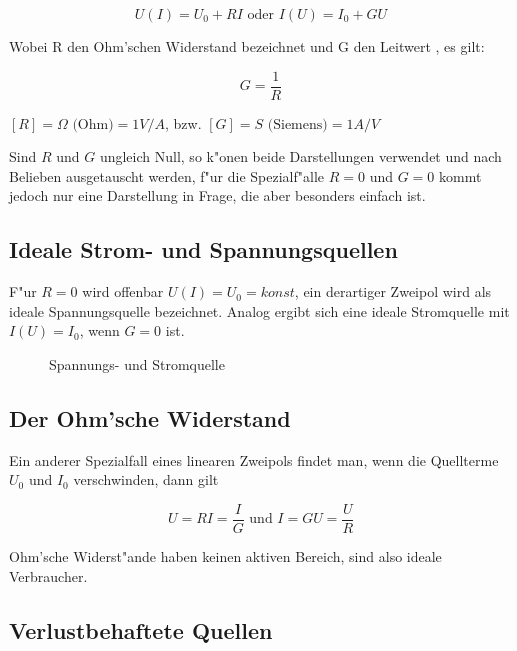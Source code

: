 \documentclass[german, 10pt, a4paper, headsepline]{scrreprt}
\theoremstyle{remark}
\begin{document}
\begin{displaymath}
	U(I)=U_0+RI \mbox{ oder } I(U)=I_0+GU
\end{displaymath}

Wobei R den Ohm'schen Widerstand  bezeichnet und G den Leitwert , es gilt:

\begin{displaymath}
	G=\frac{1}{R}
\end{displaymath}

$[R]=\Omega\mbox{ (Ohm)}=1V/A$, bzw. $[G]=S \mbox{ (Siemens)}=1A/V$

Sind $R$ und $G$ ungleich Null, so k"onen beide Darstellungen verwendet und nach Belieben ausgetauscht werden, f"ur die Spezialf"alle $R=0$ und $G=0$ kommt jedoch nur eine Darstellung in Frage, die aber besonders einfach ist.

\subsection{Ideale Strom- und Spannungsquellen}


F"ur $R=0$ wird offenbar $U(I)=U_0=konst$, ein derartiger Zweipol wird als ideale Spannungsquelle bezeichnet. Analog ergibt sich eine ideale Stromquelle mit $I(U)=I_0$, wenn $G=0$ ist.

\begin{figure}[hbt]
 
 \centerline{\box\graph}
 \caption{Spannungs- und Stromquelle}
 \label{quellen}
\end{figure}

\subsection{Der Ohm'sche Widerstand}

Ein anderer Spezialfall eines linearen Zweipols findet man, wenn die Quellterme $U_0$ und $I_0$ verschwinden, dann gilt

\begin{displaymath}
	U=RI=\frac{I}{G} \mbox{ und } I=GU=\frac{U}{R}
\end{displaymath}

Ohm'sche Widerst"ande haben keinen aktiven Bereich, sind also ideale Verbraucher.

\subsection{Verlustbehaftete Quellen}
\end{document}

